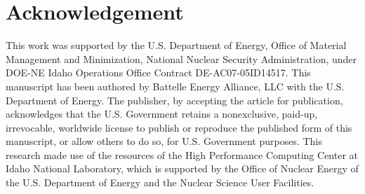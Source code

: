 \documentclass[review]{elsarticle}
\begin{document}
\section{Acknowledgement}
This work was supported by the U.S. Department of Energy, Office of Material Management and Minimization, National Nuclear Security Administration, under DOE-NE Idaho Operations Office Contract DE-AC07-05ID14517. This manuscript has been authored by Battelle Energy Alliance, LLC with the U.S. Department of Energy. The publisher, by accepting the article for publication, acknowledges that the U.S. Government retains a nonexclusive, paid-up, irrevocable, worldwide license to publish or reproduce the published form of this manuscript, or allow others to do so, for U.S. Government purposes. This research made use of the resources of the High Performance Computing Center at Idaho National Laboratory, which is supported by the Office of Nuclear Energy of the U.S. Department of Energy and the Nuclear Science User Facilities.


\end{document}
